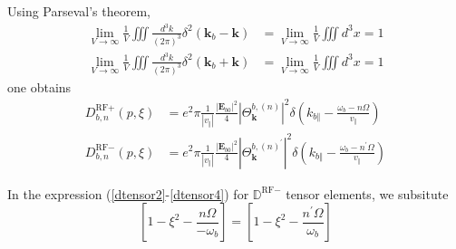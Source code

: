 Using Parseval's theorem,
\begin{align}
\lim_{V\rightarrow\infty}\frac{1}{V}\iiint\frac{d^{3}k}{(2\pi)^{3}}\delta
^{2}\left(  \mathbf{k}_{b}-\mathbf{k}\right)   &  =\lim_{V\rightarrow\infty
}\frac{1}{V}\iiint d^{3}x=1\nonumber\\
\lim_{V\rightarrow\infty}\frac{1}{V}\iiint\frac{d^{3}k}{(2\pi)^{3}}\delta
^{2}\left(  \mathbf{k}_{b}+\mathbf{k}\right)   &  =\lim_{V\rightarrow\infty
}\frac{1}{V}\iiint d^{3}x=1
\end{align}
one obtains
\begin{align}
D_{b,n}^{\text{RF}+}(p,\xi)  &  =e^{2}\pi\frac{1}{\left|  v_{\Vert}\right|
}\frac{\left|  \mathbf{E}_{b0}\right|  ^{2}}{4}\left|  \Theta_{\mathbf{k}%
}^{b,\left(  n\right)  }\right|  ^{2}\delta\left(  k_{b\Vert}-\frac{\omega
_{b}-n\Omega}{v_{\Vert}}\right) \\
D_{b,n}^{\text{RF}-}(p,\xi)  &  =e^{2}\pi\frac{1}{\left|  v_{\Vert}\right|
}\frac{\left|  \mathbf{E}_{b0}\right|  ^{2}}{4}\left|  \Theta_{\mathbf{k}%
}^{b,\left(  n\right)  ^{\prime}}\right|  ^{2}\delta\left(  k_{b\Vert}%
-\frac{\omega_{b}-n^{\prime}\Omega}{v_{\Vert}}\right)
\end{align}

In the expression (\ref{dtensor2}-\ref{dtensor4}) for $\mathbb{{D}}%
^{\text{RF}-}$ tensor elements, we subsitute%
\begin{equation}
\left[  1-\xi^{2}-\frac{n\Omega}{-\omega_{b}}\right]  =\left[  1-\xi^{2}%
-\frac{n^{\prime}\Omega}{\omega_{b}}\right]
\end{equation}

